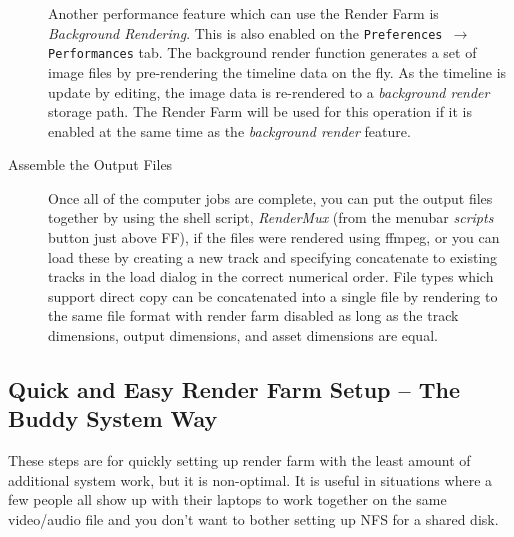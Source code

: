 \begin{description}
    Another performance feature which can use the Render Farm is \textit{Background Rendering}.  This is also enabled on the \texttt{Preferences $\rightarrow$ Performances} tab.  The background render function generates a set of image files by pre-rendering the timeline data on the fly.  As the timeline is update by editing, the image data is re-rendered to a \textit{background render} storage path.  The Render Farm will be used for this operation if it is enabled at the same time as the \textit{background render} feature.
    \item[Assemble the Output Files] Once all of the computer jobs are complete, you can put the output files together by using the shell script, \textit{RenderMux} (from the menubar \textit{scripts} button just above FF), if the files were rendered using ffmpeg, or you can load these by creating a new track and specifying concatenate to existing tracks in the load dialog in the correct numerical order.  File types which support direct copy can be concatenated into a single file by rendering to the same file format with render farm disabled as long as the track dimensions, output dimensions, and asset dimensions are equal.
\end{description}

\subsection{Quick and Easy Render Farm Setup – The Buddy System Way}%
\label{sub:buddy_system_way}

These steps are for quickly setting up render farm with the least amount of additional system work, but it is non-optimal.  It is useful in situations where a few people all show up with their laptops to work together on the same video/audio file and you don’t want to bother setting up NFS for a shared disk.

